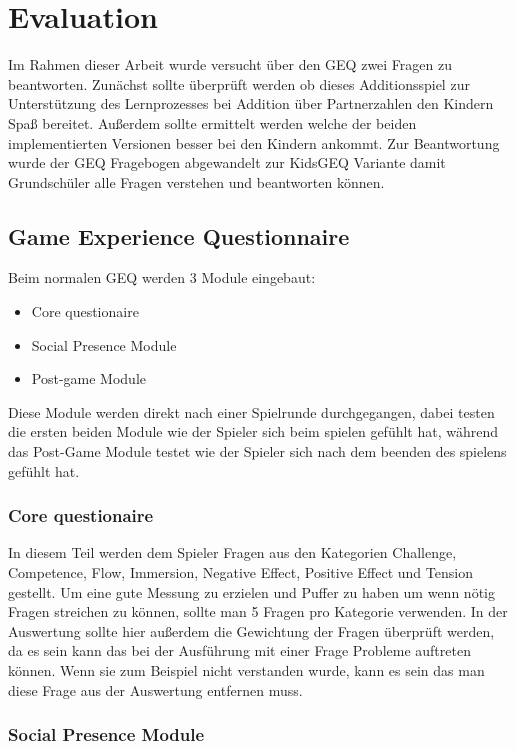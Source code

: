 \chapter{Evaluation} %
Im Rahmen dieser Arbeit wurde versucht über den GEQ zwei Fragen zu beantworten. Zunächst sollte überprüft werden ob dieses Additionsspiel zur Unterstützung des Lernprozesses bei Addition über Partnerzahlen den Kindern Spaß bereitet. Außerdem sollte ermittelt werden welche der beiden implementierten Versionen besser bei den Kindern ankommt. Zur Beantwortung wurde der GEQ Fragebogen abgewandelt zur KidsGEQ Variante damit Grundschüler alle Fragen verstehen und beantworten können.
\section{Game Experience Questionnaire}
Beim normalen GEQ werden 3 Module eingebaut:
\begin{itemize}
\item Core questionaire
\item Social Presence Module
\item Post-game Module
\end{itemize}
Diese Module werden direkt nach einer Spielrunde durchgegangen, dabei testen die ersten beiden Module wie der Spieler sich beim spielen gefühlt hat, während das Post-Game Module testet wie der Spieler sich nach dem beenden des spielens gefühlt hat.
\subsection{Core questionaire}
In diesem Teil werden dem Spieler Fragen aus den Kategorien Challenge, Competence, Flow, Immersion, Negative Effect, Positive Effect und Tension gestellt. Um eine gute Messung zu erzielen und Puffer zu haben um wenn nötig Fragen streichen zu können, sollte man 5 Fragen pro Kategorie verwenden. In der Auswertung sollte hier außerdem die Gewichtung der Fragen überprüft werden, da es sein kann das bei der Ausführung mit einer Frage Probleme auftreten können. Wenn sie zum Beispiel nicht verstanden wurde, kann es sein das man diese Frage aus der Auswertung entfernen muss.
\subsection{Social Presence Module}

